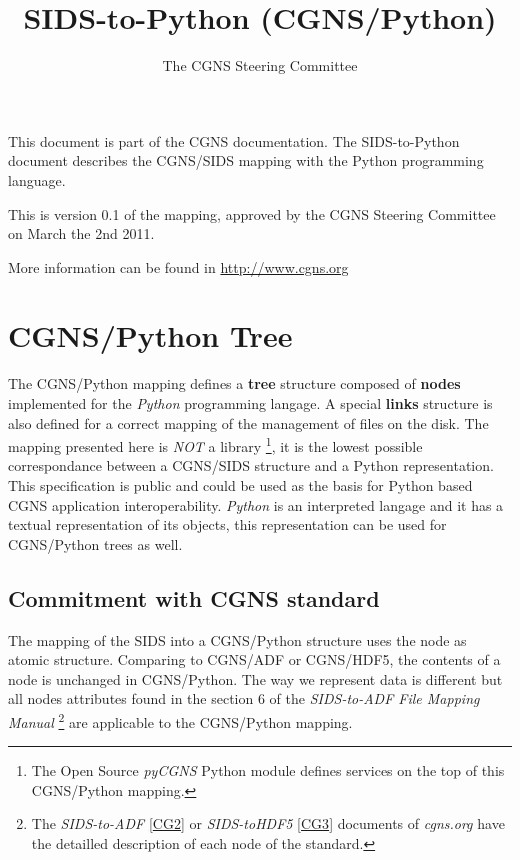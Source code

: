 \documentclass[a4paper,10pt,english]{sphinxmanual}
\title{SIDS-to-Python (CGNS/Python)}
\date{}
\author{The CGNS Steering Committee}
\begin{document}
\maketitle
\tableofcontents
{}\label{index::doc}


This document is part of the CGNS documentation.
The SIDS-to-Python document describes the CGNS/SIDS mapping with
the Python programming language.

This is version 0.1 of the mapping, approved by the CGNS Steering Committee
on March the 2nd 2011.

More information can be found in \href{http://www.cgns.org}{http://www.cgns.org}


\chapter{CGNS/Python Tree}
\label{sids-to-python::doc}\label{sids-to-python:reference-sids-to-python}\label{sids-to-python:sids-to-python}\label{sids-to-python:cgns-python-tree}
The CGNS/Python mapping defines a \textbf{tree} structure composed of
\textbf{nodes} implemented for the \emph{Python} programming langage.
A special \textbf{links} structure is also defined for a correct mapping of
the management of files on the disk.
The mapping presented here is \emph{NOT} a library \footnote{
The Open Source \emph{pyCGNS} Python module defines services on the top
of this CGNS/Python mapping.
}, it is the lowest possible
correspondance between a CGNS/SIDS structure and a Python
representation.
This specification is public and could be used as the basis for Python
based CGNS application interoperability.
\emph{Python} is an interpreted langage and it has a textual representation of
its objects, this representation can be used for CGNS/Python trees as well.


\section{Commitment with CGNS standard}
\label{sids-to-python:commitment-with-cgns-standard}
The mapping of the SIDS into a CGNS/Python structure uses the node as atomic
structure. Comparing to CGNS/ADF or CGNS/HDF5, the contents
of a node is
unchanged in CGNS/Python. The way we represent data is different but all
nodes attributes found in the section 6 of
the \emph{SIDS-to-ADF File Mapping Manual} \footnote{
The \emph{SIDS-to-ADF} {\hyperref[sids-to-python:cg2]{{[}CG2{]}}} or \emph{SIDS-toHDF5} {\hyperref[sids-to-python:cg3]{{[}CG3{]}}} documents
of \emph{cgns.org} have the
detailled description of each node of the standard.
} are applicable to the
CGNS/Python mapping.
\end{document}
